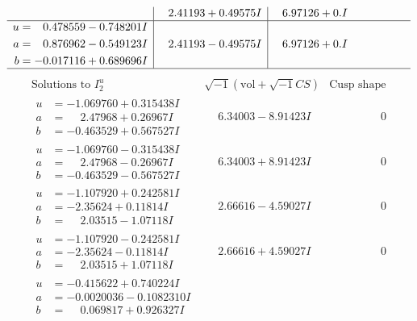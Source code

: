 \documentclass[1p]{elsarticle_modified}
\theoremstyle{definition}
\newcommand{\I}{\sqrt{-1}}
\begin{document}
$$\begin{array}{c|c|c}
 & \phantom{-}2.41193 + 0.49575 I & \phantom{-}6.97126 + 0. I\phantom{ +0.000000I} \\ \hline\begin{aligned}
u &= \phantom{-}0.478559 - 0.748201 I \\
a &= \phantom{-}0.876962 - 0.549123 I \\
b &= -0.017116 + 0.689696 I\end{aligned}
 & \phantom{-}2.41193 - 0.49575 I & \phantom{-}6.97126 + 0. I\phantom{ +0.000000I}\\
 \hline 
 \end{array}$$\newpage$$\begin{array}{c|c|c}  
\text{Solutions to }I^u_{2}& \I (\text{vol} + \sqrt{-1}CS) & \text{Cusp shape}\\
 \hline 
\begin{aligned}
u &= -1.069760 + 0.315438 I \\
a &= \phantom{-}2.47968 + 0.26967 I \\
b &= -0.463529 + 0.567527 I\end{aligned}
 & \phantom{-}6.34003 - 8.91423 I & \phantom{-0.000000 } 0 \\ \hline\begin{aligned}
u &= -1.069760 - 0.315438 I \\
a &= \phantom{-}2.47968 - 0.26967 I \\
b &= -0.463529 - 0.567527 I\end{aligned}
 & \phantom{-}6.34003 + 8.91423 I & \phantom{-0.000000 } 0 \\ \hline\begin{aligned}
u &= -1.107920 + 0.242581 I \\
a &= -2.35624 + 0.11814 I \\
b &= \phantom{-}2.03515 - 1.07118 I\end{aligned}
 & \phantom{-}2.66616 - 4.59027 I & \phantom{-0.000000 } 0 \\ \hline\begin{aligned}
u &= -1.107920 - 0.242581 I \\
a &= -2.35624 - 0.11814 I \\
b &= \phantom{-}2.03515 + 1.07118 I\end{aligned}
 & \phantom{-}2.66616 + 4.59027 I & \phantom{-0.000000 } 0 \\ \hline\begin{aligned}
u &= -0.415622 + 0.740224 I \\
a &= -0.0020036 - 0.1082310 I \\
b &= \phantom{-}0.069817 + 0.926327 I\end{aligned}

\end{array}$$
\end{document}
